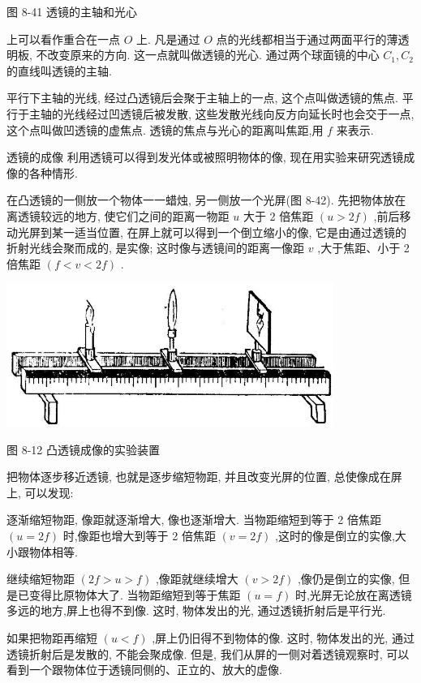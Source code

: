 \documentclass[10pt]{article}
\begin{document}
图 8-41 透镜的主轴和光心

上可以看作重合在一点 \(O\) 上. 凡是通过 \(O\) 点的光线都相当于通过两面平行的薄透明板, 不改变原来的方向. 这一点就叫做透镜的光心. 通过两个球面镜的中心 \({C}_{1},{C}_{2}\) 的直线叫透镜的主轴.

平行下主轴的光线, 经过凸透镜后会聚于主轴上的一点, 这个点叫做透镜的焦点. 平行于主轴的光线经过凹透镜后被发散, 这些发散光线向反方向延长时也会交于一点, 这个点叫做凹透镜的虚焦点. 透镜的焦点与光心的距离叫焦距,用 \(f\) 来表示.

透镜的成像 利用透镜可以得到发光体或被照明物体的像, 现在用实验来研究透镜成像的各种情形.

在凸透镜的一侧放一个物体一一蜡烛, 另一侧放一个光屏(图 8-42). 先把物体放在离透镜较远的地方, 使它们之间的距离一物距 \(u\) 大于 2 倍焦距 \(\left( {u > {2f}}\right)\) ,前后移动光屏到某一适当位置, 在屏上就可以得到一个倒立缩小的像, 它是由通过透镜的折射光线会聚而成的, 是实像; 这时像与透镜间的距离一像距 \(v\) ,大于焦距、小于 2 倍焦距 \(\left( {f < v < {2f}}\right)\) .

\begin{center}
\includegraphics[max width=0.8\textwidth]{images/01913056-1f15-74d8-9184-9aab52c9d66b_275_913441.jpg}
\end{center}

图 8-12 凸透镜成像的实验装置

把物体逐步移近透镜, 也就是逐步缩短物距, 并且改变光屏的位置, 总使像成在屏上, 可以发现:

逐渐缩短物距, 像距就逐渐增大, 像也逐渐增大. 当物距缩短到等于 2 倍焦距 \(\left( {u = {2f}}\right)\) 时,像距也增大到等于 2 倍焦距 \(\left( {v = {2f}}\right)\) ,这时的像是倒立的实像,大小跟物体相等.

继续缩短物距 \(\left( {{2f} > u > f}\right)\) ,像距就继续增大 \(\left( {v > {2f}}\right)\) ,像仍是倒立的实像, 但是已变得比原物体大了. 当物距缩短到等于焦距 \(\left( {u = f}\right)\) 时,光屏无论放在离透镜多远的地方,屏上也得不到像. 这时, 物体发出的光, 通过透镜折射后是平行光.

如果把物距再缩短 \(\left( {u < f}\right)\) ,屏上仍旧得不到物体的像. 这时, 物体发出的光, 通过透镜折射后是发散的, 不能会聚成像. 但是, 我们从屏的一侧对着透镜观察时, 可以看到一个跟物体位于透镜同侧的、正立的、放大的虚像.
\end{document}
